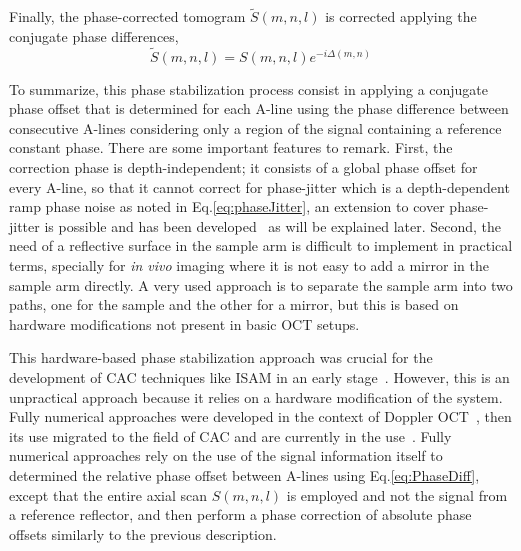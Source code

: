 Finally, the phase-corrected tomogram $\tilde{S}(m,n,l)$ is corrected applying the conjugate phase differences,
\begin{equation}
	\tilde{S}(m,n,l) = S(m,n,l)e^{-i\Delta(m,n)}
\end{equation}

To summarize, this phase stabilization process consist in applying a conjugate phase offset that is determined for each A-line using the phase difference between consecutive A-lines considering only a region of the signal containing a reference constant phase. There are some important features to remark. First, the correction phase is depth-independent; it consists of a global phase offset for every A-line, so that it cannot correct for phase-jitter which is a depth-dependent ramp phase noise as noted in Eq.\eqref{eq:phaseJitter}, an extension to cover phase-jitter is possible and has been developed~\cite{Vakoc2005_Phaseresolved} as will be explained later. Second, the need of a reflective surface in the sample arm is difficult to implement in practical terms, specially for \textit{in vivo} imaging where it is not easy to add a mirror in the sample arm directly. A very used approach is to separate the sample arm into two paths, one for the sample and the other for a mirror, but this is based on hardware modifications not present in basic OCT setups. 

This hardware-based phase stabilization approach was crucial for the development of CAC techniques like ISAM in an early stage~\cite{Ralston2006_Phase}. However, this is an unpractical approach because it relies on a hardware modification of the system. Fully numerical approaches were developed in the context of Doppler OCT~\cite{White2003_vivo}, then its use migrated to the field of CAC and are currently in the use~\cite{Shemonski2014_Threedimensional}. Fully numerical approaches rely on the use of the signal information itself to determined the relative phase offset between A-lines using Eq.\eqref{eq:PhaseDiff}, except that the entire axial scan $S(m,n,l)$ is employed and not the signal from a reference reflector, and then perform a phase correction of absolute phase offsets similarly to the previous description.

